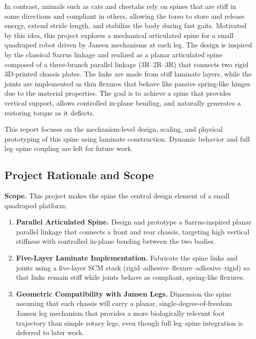 \documentclass[11pt,letterpaper]{article}
\begin{document}
In contrast, animals such as cats and cheetahs rely on spines that are stiff in
some directions and compliant in others, allowing the torso to store and
release energy, extend stride length, and stabilize the body during fast
gaits. Motivated by this idea, this project explores a mechanical articulated
spine for a small quadruped robot driven by Jansen mechanisms at each leg. The design is inspired by the classical Sarrus linkage and realized as a
planar articulated spine composed of a three-branch parallel linkage
(3R–2R–3R) that connects two rigid 3D-printed chassis plates.
The links are made from stiff laminate layers, while the joints are
implemented as thin flexures that behave like passive spring-like hinges due
to the material properties. The goal is to achieve a spine that provides
vertical support, allows controlled in-plane bending, and naturally generates a
restoring torque as it deflects.

This report focuses on the mechanism-level design, scaling, and physical
prototyping of this spine using laminate construction. Dynamic behavior and
full leg--spine coupling are left for future work.

\subsection{Project Rationale and Scope}
\label{subsec:scope}

\textbf{Scope.}  
This project makes the spine the central design element of a small quadruped
platform:
\begin{enumerate}
    \item \textbf{Parallel Articulated Spine.}  
    Design and prototype a Sarrus-inspired planar parallel linkage that
    connects a front and rear chassis, targeting high vertical stiffness with
    controlled in-plane bending between the two bodies.

    \item \textbf{Five-Layer Laminate Implementation.}  
    Fabricate the spine links and joints using a five-layer SCM stack
    (rigid--adhesive--flexure--adhesive--rigid) so that links remain stiff
    while joints behave as compliant, spring-like flexures.

    \item \textbf{Geometric Compatibility with Jansen Legs.}  
    Dimension the spine assuming that each chassis will carry a planar,
    single-degree-of-freedom Jansen leg mechanism that provides a more
    biologically relevant foot trajectory than simple rotary legs, even
    though full leg--spine integration is deferred to later work.
\end{enumerate}
\end{document}
